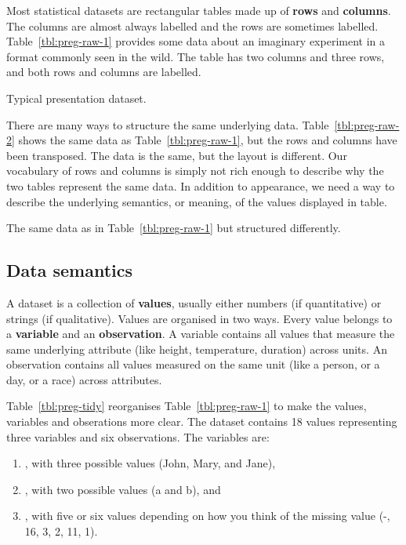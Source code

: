 \documentclass[article]{jss}
\begin{document}
Most statistical datasets are rectangular tables made up of \textbf{rows} and \textbf{columns}. The columns are almost always labelled and the rows are sometimes labelled. Table~\ref{tbl:preg-raw-1} provides some data about an imaginary experiment in a format commonly seen in the wild. The table has two columns and three rows, and both rows and columns are labelled.

\begin{table}[htbp]
  \centering
  
  \caption{Typical presentation dataset.}
  \label{tbl:preg-raw-1}
\end{table}

There are many ways to structure the same underlying data. Table~\ref{tbl:preg-raw-2} shows the same data as Table~\ref{tbl:preg-raw-1}, but the rows and columns have been transposed. The data is the same, but the layout is different. Our vocabulary of rows and columns is simply not rich enough to describe why the two tables represent the same data. In addition to appearance, we need a way to describe the underlying semantics, or meaning, of the values displayed in table.

\begin{table}[htbp]
  \centering
  
  \caption{The same data as in Table~\ref{tbl:preg-raw-1} but structured differently.}
  \label{tbl:preg-raw-2}
\end{table}

\subsection{Data semantics}

A dataset is a collection of \textbf{values}, usually either numbers (if quantitative) or strings (if qualitative). Values are organised in two ways. Every value belongs to a \textbf{variable} and an \textbf{observation}. A variable contains all values that measure the same underlying attribute (like height, temperature, duration) across units. An observation contains all values measured on the same unit (like a person, or a day, or a race) across attributes. 

Table~\ref{tbl:preg-tidy} reorganises Table~\ref{tbl:preg-raw-1} to make the values, variables and obserations more clear. The dataset contains 18 values representing three variables and six observations. The variables are:

\begin{enumerate}

\item {}, with three possible values (John, Mary, and Jane),

\item {}, with two possible values (a and b), and 

\item {}, with five or six values depending on how you think of the missing value (-, 16, 3, 2, 11, 1).

\end{enumerate}
\end{document}
